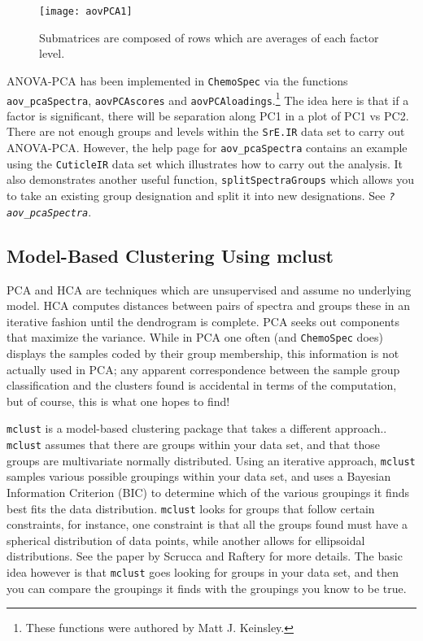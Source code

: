 \documentclass[letter,10pt,twocolumn,twoside,printwatermark=false]{pinp}
\begin{document}
\begin{figure}
\begin{center}
\texttt{[image: aovPCA1]}
\caption{\label{aovPCA1}Submatrices are composed of rows which are averages of each factor level.}
\end{center}
\end{figure}

ANOVA-PCA has been implemented in \texttt{ChemoSpec} via the functions
\texttt{aov\_pcaSpectra}, \texttt{aovPCAscores} and
\texttt{aovPCAloadings}.\footnote{These functions were authored by Matt J. Keinsley.}
The idea here is that if a factor is significant, there will be
separation along PC1 in a plot of PC1 vs PC2. There are not enough
groups and levels within the \texttt{SrE.IR} data set to carry out
ANOVA-PCA. However, the help page for \texttt{aov\_pcaSpectra} contains
an example using the \texttt{CuticleIR} data set which illustrates how
to carry out the analysis. It also demonstrates another useful function,
\texttt{splitSpectraGroups} which allows you to take an existing group
designation and split it into new designations. See
\texttt{\textsl{?aov\_pcaSpectra}}.

\hypertarget{model-based-clustering-using-mclust}{%
\subsection{Model-Based Clustering Using
mclust}\label{model-based-clustering-using-mclust}}

PCA and HCA are techniques which are unsupervised and assume no
underlying model. HCA computes distances between pairs of spectra and
groups these in an iterative fashion until the dendrogram is complete.
PCA seeks out components that maximize the variance. While in PCA one
often (and \texttt{ChemoSpec} does) displays the samples coded by their
group membership, this information is not actually used in PCA; any
apparent correspondence between the sample group classification and the
clusters found is accidental in terms of the computation, but of course,
this is what one hopes to find!

\texttt{mclust} is a model-based clustering package that takes a
different approach.\citep{Scrucca2017}. \texttt{mclust} assumes that
there are groups within your data set, and that those groups are
multivariate normally distributed. Using an iterative approach,
\texttt{mclust} samples various possible groupings within your data set,
and uses a Bayesian Information Criterion (BIC) to determine which of
the various groupings it finds best fits the data distribution.
\texttt{mclust} looks for groups that follow certain constraints, for
instance, one constraint is that all the groups found must have a
spherical distribution of data points, while another allows for
ellipsoidal distributions. See the paper by Scrucca and Raftery
\citep{Scrucca2017} for more details. The basic idea however is that
\texttt{mclust} goes looking for groups in your data set, and then you
can compare the groupings it finds with the groupings you know to be
true.
\end{document}
